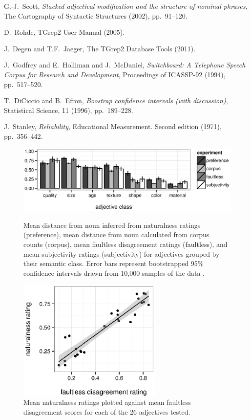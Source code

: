 \documentclass{pnastwo}
\begin{document}
\begin{article}
\begin{thebibliography}{10}
	G.-J.~Scott, {\em Stacked adjectival modification and the structure of nominal phrases}, The Cartography of Syntactic Structures (2002), pp.~91--120.
	
	D.~Rohde, TGrep2 User Manual (2005).
	
	J.~Degen and T.F.~Jaeger, The TGrep2 Database Tools (2011).
	
	J.~Godfrey and E.~Holliman and J.~McDaniel, {\em Switchboard: A Telephone Speech Corpus for Research and Development}, Proceedings of ICASSP-92 (1994),
	pp.~517--520.
	
	T.~DiCiccio and B.~Efron, {\em Boostrap confidence intervals (with discussion)}, Statistical Science, 11 (1996), pp.~189--228.
	
	J.~Stanley, {\em Reliability}, Educational Measurement. Second edition (1971), pp.~356--442.
\end{thebibliography}


\end{article}

\begin{figure}
	\centering
	{\includegraphics[width=.75\linewidth]{plots/expt_results-new.eps}}\par
	\caption{Mean distance from noun inferred from naturalness ratings (preference), mean distance from noun calculated from corpus counts (corpus),  mean faultless disagreement ratings (faultless), and mean subjectivity ratings (subjectivity) for adjectives grouped by their semantic class. Error bars represent bootstrapped 95\% confidence intervals drawn from 10,000 samples of the data \cite{diciccioefron1996}.}\label{results}
\end{figure}

\begin{figure}
	\centering\includegraphics[width=2.8in]{plots/naturalness-faultless-new.eps}
	\caption{Mean naturalness ratings plotted against mean faultless disagreement scores for each of the 26 adjectives tested.}\label{naturalness-faultless-pred}
\end{figure}
\end{document}
